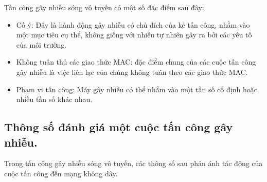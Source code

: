 \documentclass{uetgraduation}
\begin{document}
Tấn công gây nhiễu sóng vô tuyến có một số đặc điểm sau đây:
\begin{itemize}
    \item Cố ý: Đây là hành động gây nhiễu có chủ đích của kẻ tấn công, nhằm vào một mục tiêu cụ thể, không giống với nhiễu tự nhiên gây
    ra bởi các yếu tố của môi trường.
    \item Không tuân thủ các giao thức MAC: đặc điểm chung của các cuộc tấn công gây nhiễu là việc liên lạc của chúng không tuân theo các
    giao thức MAC.
    \item Phạm vi tấn công: Máy gây nhiễu có thể nhắm vào một tần số cố định hoặc nhiều tần số khác nhau.
\end{itemize}

\subsection{Thông số đánh giá một cuộc tấn công gây nhiễu.}
Trong tấn công gây nhiễu sóng vô tuyến, các thông số sau phản ánh tác động của cuộc tấn công đến mạng không dây.
\end{document}
